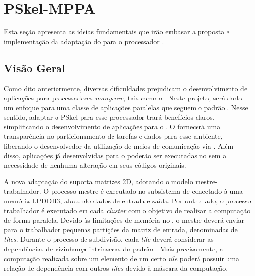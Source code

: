 \chapter{PSkel-MPPA}
\label{cha:proposta}

Esta seção apresenta as ideias fundamentais que irão embasar a proposta e implementação
da adaptação do \fw \pskel para o processador \mppa.

\section{Visão Geral}

Como dito anteriormente, diversas dificuldades prejudicam o desenvolvimento de aplicações para
processadores \textit{manycore}, tais como o \mppa. Neste projeto, será dado um enfoque para
uma classe de aplicações paralelas que seguem o padrão \stencil. Nesse sentido, adaptar
o \fw PSkel para esse processador trará benefícios claros, simplificando o desenvolvimento
de aplicações \stencil para o \mppa. O \fw fornecerá uma transparência
no particionamento de tarefas e dados para esse ambiente, liberando o desenvolvedor
da utilização de meios de comunicação via \noc. Além disso, aplicações já desenvolvidas para o
\fw poderão ser executadas no \mppa sem a necessidade de nenhuma alteração em seus códigos originais.


A nova adaptação do \fw suporta matrizes \stencil 2D, adotando o modelo
mestre-trabalhador. O processo mestre é executado no subsistema de \es conectado
à uma memória LPDDR3, alocando dados de entrada e saída. Por outro lado, o
processo trabalhador é executado em cada \textit{cluster} com o
objetivo de realizar a computação \stencil de forma paralela. Devido às
limitações de memória no \mppa, o mestre deverá enviar para o trabalhador
pequenas partições da matriz de entrada, denominadas de \textit{tiles}. Durante
o processo de subdivisão, cada \textit{tile} deverá considerar as dependências
de vizinhança intrínsecas do padrão \stencil. Mais precisamente, a computação
realizada sobre um elemento de um certo \textit{tile} poderá possuir uma relação
de dependência com outros \textit{tiles} devido à máscara da computação.

